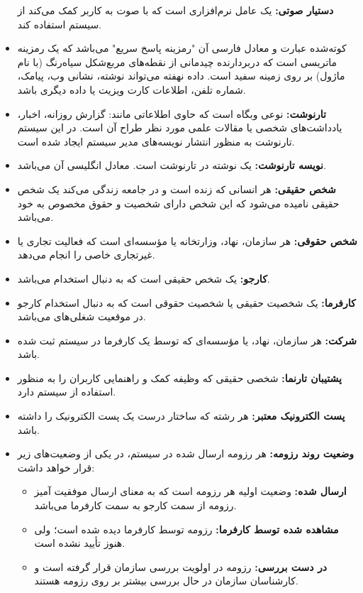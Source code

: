 \documentclass[12pt]{article}
\begin{document}
\begin{itemize}
		\textbf{دستیار صوتی:}
		یک عامل نرم‌افزاری است که با صوت به کاربر کمک می‌کند از سیستم استفاده کند.
		\item
		\textbf{}
		کوته‌شده عبارت
		و معادل فارسی آن "رمزینه پاسخ سریع" می‌باشد که یک رمزینه ماتریسی است که دربردارنده چیدمانی از نقطه‌های مربع‌شکل سیاه‌رنگ (با نام ماژول) بر روی زمینه سفید است. داده نهفته می‌تواند نوشته، نشانی وب، پیامک، شماره تلفن، اطلاعات کارت ویزیت یا داده دیگری باشد.
		\item
		\textbf{تارنوشت:}
		نوعی وبگاه است که حاوی اطلاعاتی مانند: گزارش روزانه، اخبار، یادداشت‌های شخصی یا مقالات علمی مورد نظر طراح آن است. در این سیستم تارنوشت به منظور انتشار نویسه‌های مدیر سیستم ایجاد شده است.
		\item
		\textbf{نویسه‌ تارنوشت:}
		یک نوشته در تارنوشت است. معادل انگلیسی آن
		می‌باشد.
		\item
		\textbf{شخص حقیقی:}
		هر انسانی که زنده است و در جامعه زندگی می‌کند یک شخص حقیقی نامیده می‌شود که این شخص دارای شخصیت و حقوق مخصوص به خود می‌باشد.
		\item
		\textbf{شخص حقوقی:}
		هر سازمان، نهاد، وزارتخانه یا مؤسسه‌ای است که فعالیت تجاری یا غیر‌تجاری خاصی را انجام می‌دهد.
		\item
		\textbf{کارجو:}
		یک شخص حقیقی است که به دنبال استخدام می‌باشد.
		\item
		\textbf{کارفرما:}
		یک شخصیت حقیقی یا شخصیت حقوقی است که به دنبال استخدام کارجو در موقعیت شغلی‌های  می‌باشد.
		\item
		\textbf{شرکت:}
		هر سازمان، نهاد، یا مو‌ٔسسه‌ای که توسط یک کارفرما در سیستم ثبت شده باشد.
		\item
		\textbf{پشتیبان تارنما:}
		شخصی حقیقی که وظیفه کمک و راهنمایی کاربران را به منظور استفاده از سیستم دارد.
		\item
		\textbf{پست الکترونیک معتبر:}
		هر رشته که ساختار درست یک پست الکترونیک را داشته باشد.
		\item
		\textbf{وضعیت روند رزومه:}
		هر رزومه ارسال شده در سیستم، در یکی از وضعیت‌های زیر قرار خواهد داشت:
		\begin{itemize}
			\item
			\textbf{ارسال شده:}
			وضعیت اولیه هر رزومه است که به معنای ارسال موفقیت آمیز رزومه از سمت کارجو به سمت کارفرما می‌باشد.
			\item
			\textbf{‌مشاهده شده توسط کارفرما:}
			رزومه توسط کارفرما دیده شده است؛ ولی هنوز تأیید نشده است.
			\item
			\textbf{در دست بررسی:}
			رزومه در اولویت بررسی سازمان قرار گرفته است و کارشناسان سازمان در حال بررسی بیشتر بر روی رزومه هستند.

\end{itemize}
\end{itemize}
\end{document}
